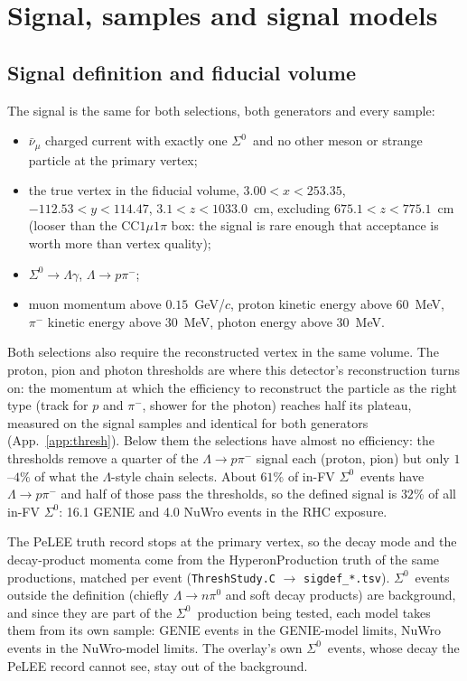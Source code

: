 \documentclass[11pt,a4paper]{article}
\newcommand{\Szero}{\ensuremath{\Sigma^{0}}}
\newcommand{\Lam}{\ensuremath{\Lambda}}
\newcommand{\numubar}{\ensuremath{\bar{\nu}_\mu}}
\begin{document}
\section{Signal, samples and signal models}
\label{sec:signal}

\subsection{Signal definition and fiducial volume}
\label{sec:sigdef}
The signal is the same for both selections, both generators and every sample:
\begin{itemize}
  \item $\numubar$ charged current with exactly one \Szero\ and no other meson or strange
        particle at the primary vertex;
  \item the true vertex in the fiducial volume, $3.00 < x < 253.35$, $-112.53 < y < 114.47$,
        $3.1 < z < 1033.0$~cm, excluding $675.1 < z < 775.1$~cm (looser than the CC$1\mu1\pi$
        box: the signal is rare enough that acceptance is worth more than vertex quality);
  \item $\Szero\to\Lam\gamma$, $\Lam\to p\pi^-$;
  \item muon momentum above $0.15$~GeV/$c$, proton kinetic energy above $60$~MeV, $\pi^-$
        kinetic energy above $30$~MeV, photon energy above $30$~MeV.
\end{itemize}
Both selections also require the reconstructed vertex in the same volume. The proton, pion
and photon thresholds are where this detector's reconstruction turns on: the momentum at which
the efficiency to reconstruct the particle as the right type (track for $p$ and $\pi^-$, shower
for the photon) reaches half its plateau, measured on the signal samples and identical for
both generators (App.~\ref{app:thresh}). Below them the selections have almost no
efficiency: the thresholds remove a quarter of the $\Lam\to p\pi^-$ signal each (proton,
pion) but only $1$--$4\%$ of what the \Lam-style chain selects. About $61\%$ of in-FV \Szero\
events have $\Lam\to p\pi^-$ and half of those pass the thresholds, so the defined signal is
$32\%$ of all in-FV \Szero: 16.1 GENIE and 4.0 NuWro events in the RHC exposure.

The PeLEE truth record stops at the primary vertex, so the decay mode and the decay-product
momenta come from the HyperonProduction truth of the same productions, matched per event
(\texttt{ThreshStudy.C} $\to$ \texttt{sigdef\_*.tsv}). \Szero\ events outside the definition
(chiefly $\Lam\to n\pi^0$ and soft decay products) are background, and since they are part of
the \Szero\ production being tested, each model takes them from its own sample: GENIE events in
the GENIE-model limits, NuWro events in the NuWro-model limits. The overlay's own \Szero\
events, whose decay the PeLEE record cannot see, stay out of the background.
\end{document}
